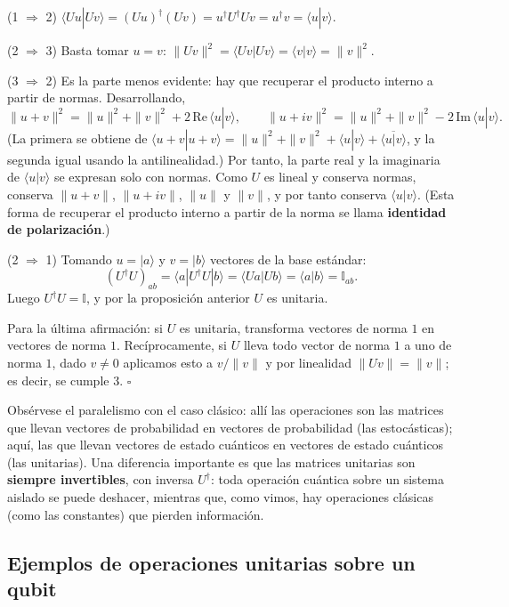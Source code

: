 \documentclass[11pt, a4paper, twoside, openright]{report}
\begin{document}
\begin{tcolorbox}[colback=gray!5!white,colframe=gray!75!black,title=\textbf{Demostración}]
(1 $\Rightarrow$ 2) $\langle Uu|Uv\rangle = (Uu)^\dagger(Uv) = u^\dagger U^\dagger U v = u^\dagger v = \langle u|v\rangle$.

(2 $\Rightarrow$ 3) Basta tomar $u = v$: $\|Uv\|^2 = \langle Uv|Uv\rangle = \langle v|v\rangle = \|v\|^2$.

(3 $\Rightarrow$ 2) Es la parte menos evidente: hay que recuperar el producto interno a partir de normas. Desarrollando,
\[ \|u + v\|^2 = \|u\|^2 + \|v\|^2 + 2\,\mathrm{Re}\,\langle u|v\rangle, \qquad \|u + iv\|^2 = \|u\|^2 + \|v\|^2 - 2\,\mathrm{Im}\,\langle u|v\rangle. \]
(La primera se obtiene de $\langle u+v|u+v\rangle = \|u\|^2 + \|v\|^2 + \langle u|v\rangle + \overline{\langle u|v\rangle}$, y la segunda igual usando la antilinealidad.) Por tanto, la parte real y la imaginaria de $\langle u|v\rangle$ se expresan solo con normas. Como $U$ es lineal y conserva normas, conserva $\|u+v\|$, $\|u+iv\|$, $\|u\|$ y $\|v\|$, y por tanto conserva $\langle u|v\rangle$. (Esta forma de recuperar el producto interno a partir de la norma se llama \textbf{identidad de polarización}.)

(2 $\Rightarrow$ 1) Tomando $u = |a\rangle$ y $v = |b\rangle$ vectores de la base estándar:
\[ (U^\dagger U)_{ab} = \langle a|U^\dagger U|b\rangle = \langle Ua|Ub\rangle = \langle a|b\rangle = \mathbb{I}_{ab}. \]
Luego $U^\dagger U = \mathbb{I}$, y por la proposición anterior $U$ es unitaria.

Para la última afirmación: si $U$ es unitaria, transforma vectores de norma $1$ en vectores de norma $1$. Recíprocamente, si $U$ lleva todo vector de norma $1$ a uno de norma $1$, dado $v \neq 0$ aplicamos esto a $v/\|v\|$ y por linealidad $\|Uv\| = \|v\|$; es decir, se cumple 3. \hfill $\square$
\end{tcolorbox}

\noindent Obsérvese el paralelismo con el caso clásico: allí las operaciones son las matrices que llevan vectores de probabilidad en vectores de probabilidad (las estocásticas); aquí, las que llevan vectores de estado cuánticos en vectores de estado cuánticos (las unitarias). Una diferencia importante es que las matrices unitarias son \textbf{siempre invertibles}, con inversa $U^\dagger$: toda operación cuántica sobre un sistema aislado se puede deshacer, mientras que, como vimos, hay operaciones clásicas (como las constantes) que pierden información.

\subsection{Ejemplos de operaciones unitarias sobre un qubit}
\end{document}
